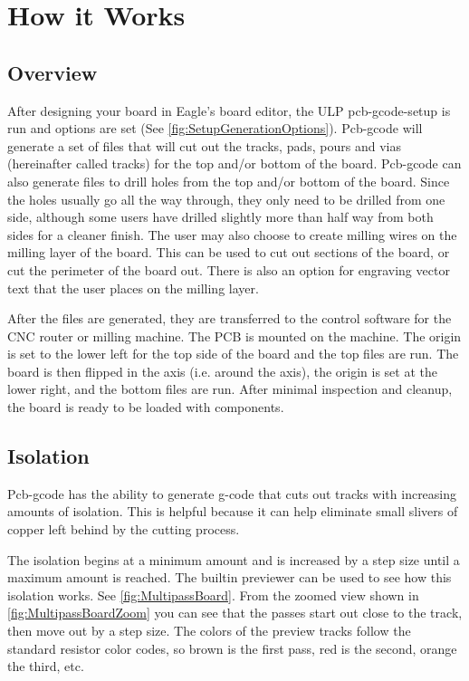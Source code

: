 \documentclass[11pt]{book}
\begin{document}
%
%
\section{How it Works}\label{sec:HowItWorks}
\subsection{Overview}
After designing your board in Eagle's board editor, the ULP pcb-gcode-setup is run and options are set (See \figurename \vref{fig:SetupGenerationOptions}). Pcb-gcode will generate a set of files that will cut out the tracks, pads, pours and vias (hereinafter called tracks) for the top and/or bottom of the board. Pcb-gcode can also generate files to drill holes from the top and/or bottom of the board. Since the holes usually go all the way through, they only need to be drilled from one side, although some users have drilled slightly more than half way from both sides for a cleaner finish. The user may also choose to create milling wires on the milling layer of the board. This can be used to cut out sections of the board, or cut the perimeter of the board out. There is also an option for engraving vector text that the user places on the milling layer.

After the files are generated, they are transferred to the control software for the CNC router or milling machine. The PCB is mounted on the machine. The origin is set to the lower left for the top side of the board and the top files are run. The board is then flipped in the  axis (i.e. around the  axis), the origin is set at the lower right, and the bottom files are run. After minimal inspection and cleanup, the board is ready to be loaded with components.

\subsection{Isolation}
Pcb-gcode has the ability to generate g-code that cuts out tracks with increasing amounts of isolation. This is helpful because it can help eliminate small slivers of copper left behind by the cutting process.

The isolation begins at a minimum amount and is increased by a step size until a maximum amount is reached. The builtin previewer can be used to see how this isolation works. See \figurename \vref{fig:MultipassBoard}. From the zoomed view shown in \figurename \vref{fig:MultipassBoardZoom} you can see that the passes start out close to the track, then move out by a step size. The colors of the preview tracks follow the standard resistor color codes, so brown is the first pass, red is the second, orange the third, etc.
\end{document}

